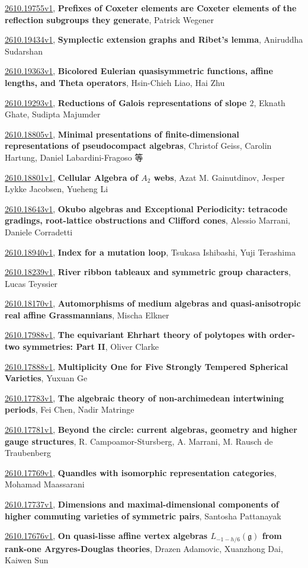 \documentclass[9pt, a4paper]{article}
\theoremstyle{plain}
\theoremstyle{definition}
\theoremstyle{remark}
\newcommand{\arxiv}[3]{\href{https://arxiv.org/abs/#1}{#1}, \textbf{\textcolor{arxivblue}{#2}}, #3}
\begin{document}
\arxiv{2610.19755v1}{Prefixes of Coxeter elements are Coxeter elements of the reflection subgroups they generate}{Patrick Wegener}

\arxiv{2610.19434v1}{Symplectic extension graphs and Ribet's lemma}{Aniruddha Sudarshan}

\arxiv{2610.19363v1}{Bicolored Eulerian quasisymmetric functions, affine lengths, and Theta operators}{Hsin-Chieh Liao, Hai Zhu}

\arxiv{2610.19293v1}{Reductions of Galois representations of slope $2$}{Eknath Ghate, Sudipta Majumder}

\arxiv{2610.18805v1}{Minimal presentations of finite-dimensional representations of pseudocompact algebras}{Christof Geiss, Carolin Hartung, Daniel Labardini-Fragoso 等}

\arxiv{2610.18801v1}{Cellular Algebra of $A_2$ webs}{Azat M. Gainutdinov, Jesper Lykke Jacobsen, Yueheng Li}

\arxiv{2610.18643v1}{Okubo algebras and Exceptional Periodicity: tetracode gradings, root-lattice obstructions and Clifford cones}{Alessio Marrani, Daniele Corradetti}

\arxiv{2610.18940v1}{Index for a mutation loop}{Tsukasa Ishibashi, Yuji Terashima}

\arxiv{2610.18239v1}{River ribbon tableaux and symmetric group characters}{Lucas Teyssier}

\arxiv{2610.18170v1}{Automorphisms of medium algebras and quasi-anisotropic real affine Grassmannians}{Mischa Elkner}

\arxiv{2610.17988v1}{The equivariant Ehrhart theory of polytopes with order-two symmetries: Part II}{Oliver Clarke}

\arxiv{2610.17888v1}{Multiplicity One for Five Strongly Tempered Spherical Varieties}{Yuxuan Ge}

\arxiv{2610.17783v1}{The algebraic theory of non-archimedean intertwining periods}{Fei Chen, Nadir Matringe}

\arxiv{2610.17781v1}{Beyond the circle: current algebras, geometry and higher gauge structures}{R. Campoamor-Stursberg, A. Marrani, M. Rausch de Traubenberg}

\arxiv{2610.17769v1}{Quandles with isomorphic representation categories}{Mohamad Maassarani}

\arxiv{2610.17737v1}{Dimensions and maximal-dimensional components of higher commuting varieties of symmetric pairs}{Santosha Pattanayak}

\arxiv{2610.17676v1}{On quasi-lisse affine vertex algebras $L_{-1-h/6}(\mathfrak{g})$ from rank-one Argyres-Douglas theories}{Drazen Adamovic, Xuanzhong Dai, Kaiwen Sun}
\end{document}
